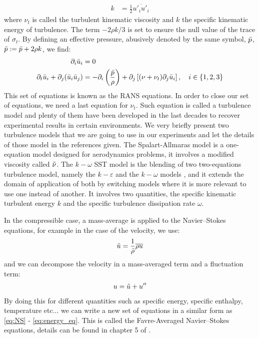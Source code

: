 \begin{subappendices}
\begin{align}
		k &= \frac{1}{2}\overline{u'_i u'_i}
	\end{align}
	where $\nu_t$ is called the turbulent kinematic viscosity and $k$ the specific kinematic energy of turbulence. The term $-2\rho k/3$ is set to ensure the null value of the trace of $\sigma_t$. By defining an effective pressure, abusively denoted by the same symbol, $\Bar{p}$, $\Bar{p} := \Bar{p} + 2\rho k$, we find:
	\begin{align}
		\partial_i \Bar{u}_i &= 0 \\
		\partial_t\Bar{u}_i + \partial_j(\Bar{u}_i\Bar{u}_j) &= -\partial_i\left(\frac{\Bar{p}}{\rho}\right) + \partial_{j}\left[(\nu + \nu_t)\partial_{j}\Bar{u}_i\right], \quad i\in\{1,2,3\}
	\end{align}
	This set of equations is known as the \acrfull{RANS} equations. In order to close our set of equations, we need a last equation for $\nu_t$. Such equation is called a turbulence model and plenty of them have been developed in the last decades to recover experimental results in certain environments. We very briefly present two turbulence models that we are going to use in our experiments and let the details of those model in the references given. The Spalart-Allmaras model \cite{spalart} is a one-equation model designed for aerodynamics problems, it involves a modified viscosity called $\Tilde{\nu}$. The $k-\omega$ SST model \cite{SST} is the blending of two two-equations turbulence model, namely the $k-\varepsilon$ and the $k-\omega$ models \cite{kepsilon, komega}, and it extends the domain of application of both by switching models where it is more relevant to use one instead of another. It involves two quantities, the specific kinematic turbulent energy $k$ and the specific turbulence dissipation rate $\omega$.
	
	In the compressible case, a mass-average is applied to the Navier–Stokes equations, for example in the case of the velocity, we use:
	\begin{align}
		\Tilde{u} = \frac{1}{\Bar{\rho}}\overline{\rho u}
	\end{align}
	and we can decompose the velocity in a mass-averaged term and a fluctuation term:
	\begin{align}
		u = \Tilde{u} + u''
	\end{align}
	By doing this for different quantities such as specific energy, specific enthalpy, temperature etc... we can write a new set of equations in a similar form as \ref{eq:NS} - \ref{eq:energy_eq}. This is called the Favre-Averaged Navier–Stokes equations, details can be found in chapter 5 of \cite{wilcox}.
	

\end{subappendices}
